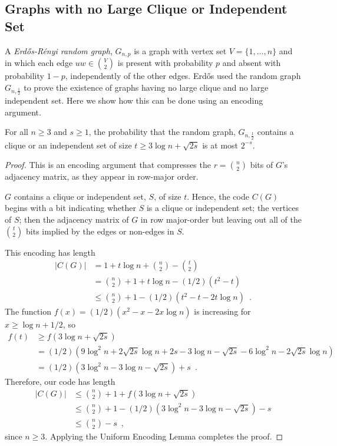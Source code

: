\documentclass{patmorin}
\begin{document}
\subsection{Graphs with no Large Clique or Independent Set}


A \emph{Erd\H{o}s-R\'enyi random graph}, $G_{n,p}$ is a graph with vertex
set $V=\{1,\ldots,n\}$ and in which each edge $uw\in \binom{V}{2}$
is present with probability $p$ and absent with probability $1-p$,
independently of the other edges.  Erd\H{o}s \cite{erdos:some} used the random
graph $G_{n,\frac{1}{2}}$ to prove the existence of graphs having no
large clique and no large independent set. Here we show how this can be
done using an encoding argument.

\begin{thm}
  For all $n\ge 3$ and $s\ge 1$, the probability that the random
  graph, $G_{n,\frac{1}{2}}$ contains a clique or an independent set
  of size $t \ge 3\log n + \sqrt{2s}$ is at most $2^{-s}$.
\end{thm}

\begin{proof}
  This is an encoding argument that compresses the $r=\binom{n}{2}$
  bits of $G$'s adjacency matrix, as they appear in row-major order.
  
  $G$ contains a clique or independent set, $S$, of size $t$. Hence,
  the code $C(G)$ begins with a bit indicating whether $S$ is a clique
  or independent set; the vertices of $S$; then the adjacency matrix
  of $G$ in row major-order but leaving out all of the $\binom{t}{2}$
  bits implied by the edges or non-edges in $S$.
  
  This encoding has length
  \begin{align*}
    |C(G)| & = 1 + t\log n + \binom{n}{2}-\binom{t}{2} \\
           & = \binom{n}{2} + 1 + t\log n - (1/2)(t^2 - t) \\
           & \le \binom{n}{2} + 1 - (1/2)(t^2 - t - 2t \log n) \enspace .
  \end{align*}
  The function $f(x) = (1/2)(x^2 - x - 2x \log n)$ is increasing for
  $x \geq \log n + 1/2$, so
  \begin{align*}
    f(t) &\ge f(3\log n + \sqrt{2s}) \\
    &= (1/2)(9 \log^2 n + 2 \sqrt{2s} \log n + 2s - 3 \log n - \sqrt{2s} - 6 \log^2 n - 2 \sqrt{2s} \log n) \\
    &= (1/2)(3 \log^2 n - 3 \log n - \sqrt{2s}) + s \enspace .
  \end{align*}
  Therefore, our code has length
  \begin{align*}
    |C(G)| & \le \binom{n}{2} + 1 + f(3 \log n + \sqrt{2s}) \\
	   & \le \binom{n}{2} + 1 - (1/2)(3 \log^2 n - 3 \log n - \sqrt{2s}) - s \\
           & \le \binom{n}{2} - s \enspace ,
  \end{align*}
  since $n \ge 3$. Applying the Uniform Encoding Lemma completes the
  proof.
\end{proof}
\end{document}
